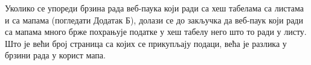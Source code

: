 Уколико се упореди брзина рада веб-паука који ради са хеш табелама са листама и
са мапама (погледати Додатак Б), долази се до закључка да веб-паук који ради са мапама много брже
похрањује податке у хеш табелу него што то ради у листу. Што је већи број
страница са којих се прикупљају подаци, већа је разлика у брзини рада у корист
мапа.


